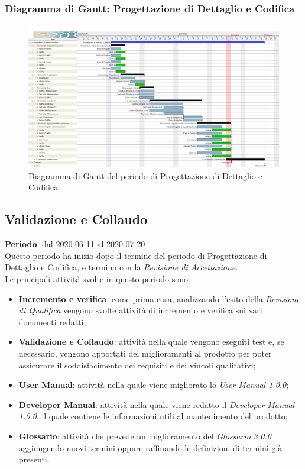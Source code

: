 \subsubsection{Diagramma di Gantt: Progettazione di Dettaglio e Codifica}
	\begin{figure}[h]
		\centering
		\includegraphics[width=1.1\textwidth]{./res/img/DiagrammiGantt/prog_dett_gantt.png}
		\caption{Diagramma di Gantt del periodo di Progettazione di Dettaglio e Codifica}
	\end{figure}


\newpage

\subsection{Validazione e Collaudo}
\textbf{Periodo}: dal 2020-06-11 al 2020-07-20 \\
Questo periodo ha inizio dopo il termine del periodo di Progettazione di Dettaglio e Codifica, e termina con la \textit{Revisione di Accettazione}. \\
Le principali attività svolte in questo periodo sono:
\begin{itemize}
	\item \textbf{Incremento e verifica}: come prima cosa, analizzando l'esito della \textit{Revisione di Qualifica} vengono svolte attività di incremento e verifica sui vari documenti redatti;
	\item \textbf{Validazione e Collaudo}: attività nella quale vengono eseguiti test e, se necessario, vengono apportati dei miglioramenti al prodotto per poter assicurare il soddisfacimento dei requisiti e dei vincoli qualitativi;
	\item \textbf{User Manual}: attività nella quale viene migliorato lo \textit{User Manual 1.0.0};
	\item \textbf{Developer Manual}: attività nella quale viene redatto il \textit{Developer Manual 1.0.0}, il quale contiene le informazioni utili al mantenimento del prodotto;
	\item \textbf{Glossario}: attività che prevede un miglioramento del \textit{Glossario 3.0.0} aggiungendo nuovi termini oppure raffinando le definizioni di termini già presenti.
\end{itemize}
